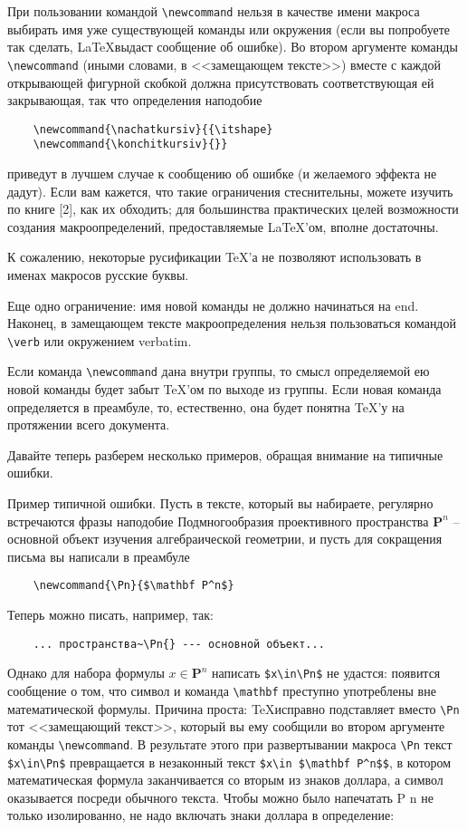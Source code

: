 При пользовании командой \verb"\newcommand" нельзя в качестве имени макроса выбирать имя уже существующей команды или окружения (если вы попробуете так сделать, \LaTeX выдаст сообщение об ошибке). Во втором аргументе команды \verb"\newcommand" (иными словами, в <<замещающем тексте>>) вместе с каждой открывающей фигурной скобкой должна присутствовать соответствующая ей закрывающая, так что определения наподобие

\begin{verbatim}
	\newcommand{\nachatkursiv}{{\itshape}
	\newcommand{\konchitkursiv}{}}
\end{verbatim}
приведут в лучшем случае к сообщению об ошибке (и желаемого эффекта не дадут). Если вам кажется, что такие ограничения стеснительны,
можете изучить по книге [2], как их обходить; для большинства практических целей возможности создания макроопределений, предоставляемые \LaTeX’ом, вполне достаточны.

К сожалению, некоторые русификации \TeX’а не позволяют использовать в именах макросов русские буквы.

Еще одно ограничение: имя новой команды не должно начинаться на end. Наконец, в замещающем тексте макроопределения нельзя пользоваться командой \verb"\verb" или окружением verbatim.

Если команда \verb"\newcommand" дана внутри группы, то смысл определяемой ею новой команды будет забыт \TeX’ом по выходе из группы. Если новая команда определяется в преамбуле, то, естественно, она будет понятна \TeX’у на протяжении всего документа.

Давайте теперь разберем несколько примеров, обращая внимание на типичные ошибки.

Пример типичной ошибки. Пусть в тексте, который вы набираете, регулярно встречаются фразы наподобие Подмногообразия проективного пространства $\mathbf P^n$ -- основной объект изучения алгебраической геометрии, и пусть для сокращения письма вы написали в преамбуле

\begin{verbatim}
	\newcommand{\Pn}{$\mathbf P^n$}
\end{verbatim}

Теперь можно писать, например, так:

\begin{verbatim}
	... пространства~\Pn{} --- основной объект...
\end{verbatim}

Однако для набора формулы $x \in {\mathbf P^n}$ написать \verb"$x\in\Pn$" не удастся: появится сообщение о том, что символ и команда \verb"\mathbf" преступно употреблены вне математической формулы. Причина проста: \TeX исправно подставляет вместо \verb"\Pn" тот <<замещающий текст>>, который вы ему сообщили во втором аргументе команды \verb"\newcommand". В результате этого при развертывании макроса \verb"\Pn" текст \verb"$x\in\Pn$" превращается в незаконный текст \verb"$x\in $\mathbf P^n$$", в котором математическая формула заканчивается со вторым из знаков доллара, а символ оказывается посреди обычного текста. Чтобы можно было напечатать P n не только изолированно, не надо включать знаки доллара в определение:

